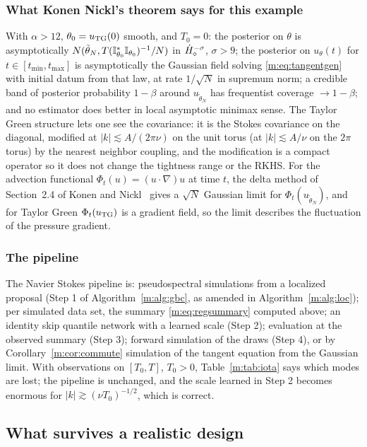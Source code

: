 \subsubsection{What Konen Nickl's theorem says for this example} With $\alpha>12$, $\theta_0=u_{\rm TG}(0)$ smooth, and $T_0=0$: the posterior on $\theta$ is asymptotically $N(\tilde\theta_N,T(\mathbb{I}^*_{\theta_0}\mathbb{I}_{\theta_0})^{-1}/N)$ in $\dot H^{-\sigma}_\diamond$, $\sigma>9$; the posterior on $u_\theta(t)$ for $t\in[t_{\min},t_{\max}]$ is asymptotically the Gaussian field solving \eqref{m:eq:tangentgen} with initial datum from that law, at rate $1/\sqrt N$ in supremum norm; a credible band of posterior probability $1-\beta$ around $u_{\tilde\theta_N}$ has frequentist coverage $\to1-\beta$; and no estimator does better in local asymptotic minimax sense. The Taylor Green structure lets one see the covariance: it is the Stokes covariance on the diagonal, modified at $|k|\lesssim A/(2\pi\nu)$ on the unit torus (at $|k|\lesssim A/\nu$ on the $2\pi$ torus) by the nearest neighbor coupling, and the modification is a compact operator so it does not change the tightness range or the RKHS. For the advection functional $\Phi_t(u)=(u\cdot\nabla)u$ at time $t$, the delta method of Section~2.4 of Konen and Nickl~\cite{konennickl2026} gives a $\sqrt N$ Gaussian limit for $\Phi_t(u_{\tilde\theta_N})$, and for Taylor Green $\Phi_t(u_{\rm TG})$ is a gradient field, so the limit describes the fluctuation of the pressure gradient.

\subsubsection{The pipeline} The Navier Stokes pipeline is: pseudospectral simulations from a localized proposal (Step 1 of Algorithm~\ref{m:alg:gbc}, as amended in Algorithm~\ref{m:alg:loc}); per simulated data set, the summary \eqref{m:eq:regsummary} computed above; an identity skip quantile network with a learned scale (Step 2); evaluation at the observed summary (Step 3); forward simulation of the draws (Step 4), or by Corollary~\ref{m:cor:commute} simulation of the tangent equation from the Gaussian limit. With observations on $[T_0,T]$, $T_0>0$, Table~\ref{m:tab:iota} says which modes are lost; the pipeline is unchanged, and the scale learned in Step 2 becomes enormous for $|k|\gtrsim(\nu T_0)^{-1/2}$, which is correct.

\subsection{What survives a realistic design}\label{m:sec:designrobust}

